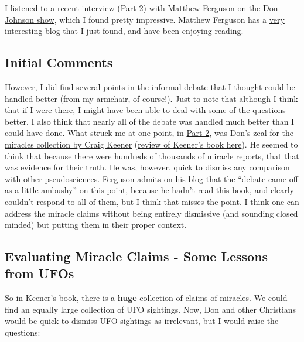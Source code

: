 \documentclass{tufte-book}
\begin{document}
I listened to a
\href{http://donjohnsonministries.org/discussion-with-naturalist-matthew-ferguson-part-1/}{recent
interview}
(\href{http://donjohnsonministries.org/discussion-with-naturalist-matthew-ferguson-part-2/)}{Part
2}) with Matthew Ferguson on the
\href{http://donjohnsonministries.org/}{Don Johnson show}, which I found
pretty impressive. Matthew Ferguson has a
\href{http://adversusapologetica.wordpress.com/}{very interesting blog}
that I just found, and have been enjoying reading.

\subsection{Initial Comments}\label{pandoc-initial-comments}

However, I did find several points in the informal debate that I thought
could be handled better (from my armchair, of course!). Just to note
that although I think that if I were there, I might have been able to
deal with some of the questions better, I also think that nearly all of
the debate was handled much better than I could have done. What struck
me at one point, in
\href{http://donjohnsonministries.org/discussion-with-naturalist-matthew-ferguson-part-2/)}{Part
2}, was Don's zeal for the
\href{http://www.amazon.com/Miracles-Credibility-New-Testament-Accounts/dp/0801039525}{miracles
collection by Craig Keener}
(\href{http://www.uncrediblehallq.net/2012/01/0shou5/review-of-craig-keeners-miracles/)}{review
of Keener's book here}). He seemed to think that because there were
hundreds of thousands of miracle reports, that that was evidence for
their truth. He was, however, quick to dismiss any comparison with other
pseudosciences. Ferguson admits on his blog that the ``debate came off
as a little ambushy'' on this point, because he hadn't read this book,
and clearly couldn't respond to all of them, but I think that misses the
point. I think one can address the miracle claims without being entirely
dismissive (and sounding closed minded) but putting them in their proper
context.

\subsection{Evaluating Miracle Claims - Some Lessons from
UFOs}\label{pandoc-evaluating-miracle-claims---some-lessons-from-ufos}

So in Keener's book, there is a \textbf{huge} collection of claims of
miracles. We could find an equally large collection of UFO sightings.
Now, Don and other Christians would be quick to dismiss UFO sightings as
irrelevant, but I would raise the questions:
\end{document}
